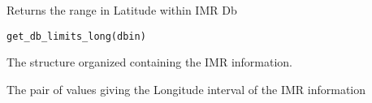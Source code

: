 %
\begin{Description}\relax
Returns the range in Latitude within IMR Db
\end{Description}
%
\begin{Usage}
\begin{verbatim}
get_db_limits_long(dbin)
\end{verbatim}
\end{Usage}
%
\begin{Arguments}
\begin{ldescription}
\item[\code{dbin}] 
The  structure organized containing the IMR
information.

\end{ldescription}
\end{Arguments}
%
\begin{Value}
The pair of values giving the Longitude interval of the IMR information
\end{Value}
